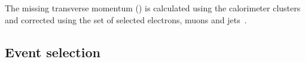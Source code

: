 
The missing transverse momentum (\met{}) is calculated using the calorimeter clusters and corrected using the set of selected electrons, muons and jets~\cite{Aad:2012re}.



\subsection{Event selection}\label{sect:selection}

